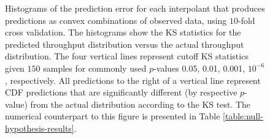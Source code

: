 \documentclass[smallextended,final]{svjour3}  %
\begin{document}
\begin{figure}
  \centering
  \caption{Histograms of the prediction error for each interpolant
    that produces predictions as convex combinations of observed data,
    using $10$-fold cross validation. The histograms show the KS
    statistics for the predicted throughput distribution versus the
    actual throughput distribution. The four vertical lines represent
    cutoff KS statistics given $150$ samples for commonly used
    $p$-values 0.05, 0.01, 0.001, $10^{-6}$, respectively. All
    predictions to the right of a vertical line represent CDF
    predictions that are significantly different (by respective
    $p$-value) from the actual distribution according to the KS
    test. The numerical counterpart to this figure is presented in
    Table \ref{table:null-hypothesis-results}.}
  \label{fig:throughput-prediction}
\end{figure}
\end{document}
